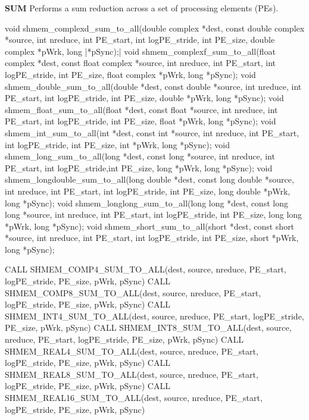 \begin{apidefinition}
\bigskip
\textbf{SUM} \newline
Performs a sum reduction across a set of processing elements (\ac{PE}s).\newline
\begin{Csynopsis}
void shmem_complexd_sum_to_all(double complex *dest, const double complex *source, int nreduce, int PE_start, int logPE_stride, int PE_size, double complex *pWrk, long |\mbox{*pSync);}|
void shmem_complexf_sum_to_all(float complex *dest, const float complex *source, int nreduce, int PE_start, int logPE_stride, int PE_size, float complex *pWrk, long *pSync);
void shmem_double_sum_to_all(double *dest, const double *source, int nreduce, int PE_start, int logPE_stride, int PE_size, double *pWrk, long *pSync);
void shmem_float_sum_to_all(float *dest, const float *source, int nreduce, int PE_start, int logPE_stride, int PE_size, float *pWrk, long *pSync);
void shmem_int_sum_to_all(int *dest, const int *source, int nreduce, int PE_start, int logPE_stride, int PE_size, int *pWrk, long *pSync);
void shmem_long_sum_to_all(long *dest, const long *source, int nreduce, int PE_start, int logPE_stride,int PE_size, long *pWrk, long *pSync);
void shmem_longdouble_sum_to_all(long double *dest, const long double *source, int nreduce, int PE_start, int logPE_stride, int PE_size, long double *pWrk, long *pSync);
void shmem_longlong_sum_to_all(long long *dest, const long long *source, int nreduce, int PE_start, int logPE_stride, int PE_size, long long *pWrk, long *pSync);
void shmem_short_sum_to_all(short *dest, const short *source, int nreduce, int PE_start, int logPE_stride, int PE_size, short *pWrk, long *pSync);
\end{Csynopsis}

\begin{Fsynopsis}
CALL SHMEM_COMP4_SUM_TO_ALL(dest, source, nreduce, PE_start, logPE_stride, PE_size, pWrk, pSync)
CALL SHMEM_COMP8_SUM_TO_ALL(dest, source, nreduce, PE_start, logPE_stride, PE_size, pWrk, pSync)
CALL SHMEM_INT4_SUM_TO_ALL(dest, source, nreduce, PE_start, logPE_stride, PE_size, pWrk, pSync)
CALL SHMEM_INT8_SUM_TO_ALL(dest, source, nreduce, PE_start, logPE_stride, PE_size, pWrk, pSync)
CALL SHMEM_REAL4_SUM_TO_ALL(dest, source, nreduce, PE_start, logPE_stride, PE_size, pWrk, pSync)
CALL SHMEM_REAL8_SUM_TO_ALL(dest, source, nreduce, PE_start, logPE_stride, PE_size, pWrk, pSync)
CALL SHMEM_REAL16_SUM_TO_ALL(dest, source, nreduce, PE_start, logPE_stride, PE_size, pWrk, pSync)
\end{Fsynopsis}


\end{apidefinition}
